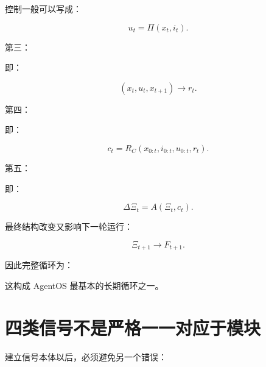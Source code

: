 控制一般可以写成：

\[
u_t
=
\Pi(
x_t,
i_t
).
\]

第三：

\begin{statementbox}
\centering
{}
\end{statementbox}

即：

\[
(x_t,u_t,x_{t+1})
\rightarrow
r_t.
\]

第四：

\begin{statementbox}
\centering
{}
\end{statementbox}

即：

\[
c_t
=
R_C(
x_{0:t},
i_{0:t},
u_{0:t},
r_t
).
\]

第五：

\begin{statementbox}
\centering
{}
\end{statementbox}

即：

\[
\Delta\Xi_t
=
A(
\Xi_t,
c_t
).
\]

最终结构改变又影响下一轮运行：

\[
\boxed{
\Xi_{t+1}
\rightarrow
F_{t+1}.
}
\]

因此完整循环为：

\begin{statementbox}
\centering
{}
\end{statementbox}

这构成 AgentOS 最基本的长期循环之一。

\section{四类信号不是严格一一对应于模块}

建立信号本体以后，必须避免另一个错误：

\begin{statementbox}
\centering
{}
\end{statementbox}

